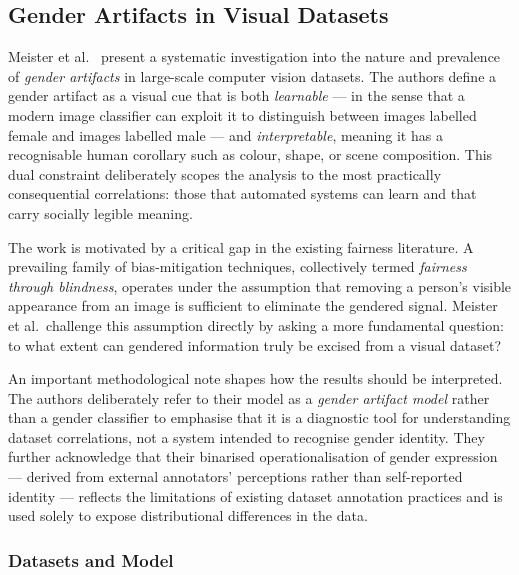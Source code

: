 \subsection{Gender Artifacts in Visual Datasets}
\label{subsec:meister2023}

Meister et al.~\cite{Meister_2023_GenderArtifactsinVisualDatasets} present a systematic
investigation into the nature and prevalence of \emph{gender artifacts} in large-scale
computer vision datasets.  The authors define a gender artifact as a visual cue that is both
\emph{learnable} --- in the sense that a modern image classifier can exploit it to distinguish
between images labelled female and images labelled male --- and \emph{interpretable}, meaning
it has a recognisable human corollary such as colour, shape, or scene composition.  This dual
constraint deliberately scopes the analysis to the most practically consequential
correlations: those that automated systems can learn and that carry socially legible meaning.

The work is motivated by a critical gap in the existing fairness literature.  A prevailing
family of bias-mitigation techniques, collectively termed \emph{fairness through blindness},
operates under the assumption that removing a person's visible appearance from an image is sufficient to eliminate the gendered signal.  Meister et al.\ challenge this assumption
directly by asking a more fundamental question: to what extent can gendered information truly
be excised from a visual dataset?

An important methodological note shapes how the results should be interpreted.  The authors
deliberately refer to their model as a \emph{gender artifact model} rather than a gender
classifier to emphasise that it is a diagnostic tool for understanding dataset correlations,
not a system intended to recognise gender identity.  They further acknowledge that their
binarised operationalisation of gender expression --- derived from external annotators'
perceptions rather than self-reported identity --- reflects the limitations of existing
dataset annotation practices and is used solely to expose distributional differences in the
data.

\subsubsection*{Datasets and Model}

